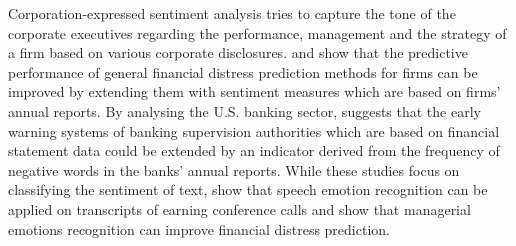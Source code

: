 Corporation-expressed sentiment analysis tries to capture the tone of the corporate executives regarding the performance, management and the strategy of a firm based on various corporate disclosures. \cite{hajek2023} and \cite{huang2023} show that the predictive performance of general financial distress prediction methods for firms can be improved by extending them with sentiment measures which are based on firms' annual reports. By analysing the U.S. banking sector, \cite{gandhi2019} suggests that the early warning systems of banking supervision authorities which are based on financial statement data could be extended by an indicator derived from the frequency of negative words in the banks' annual reports. While these studies focus on classifying the sentiment of text, \cite{hajek2023} show that speech emotion recognition can be applied on transcripts of earning conference calls and show that managerial emotions recognition can improve financial distress prediction. \\

